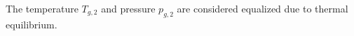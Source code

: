 The temperature \( T_{g,2} \) and pressure \( p_{g,2} \) are considered equalized due to thermal equilibrium.